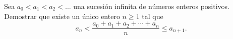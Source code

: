 Sea $a_0 \lt a_1 \lt a_2 \lt \dots$ una sucesión infinita de números enteros positivos. Demostrar que existe un único entero $n \geq 1$ tal que
\[a_n < \frac{a_0+a_1+a_2+\cdots+a_n}{n} \leq a_{n+1}.\]